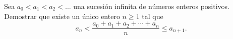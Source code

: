 Sea $a_0 \lt a_1 \lt a_2 \lt \dots$ una sucesión infinita de números enteros positivos. Demostrar que existe un único entero $n \geq 1$ tal que
\[a_n < \frac{a_0+a_1+a_2+\cdots+a_n}{n} \leq a_{n+1}.\]